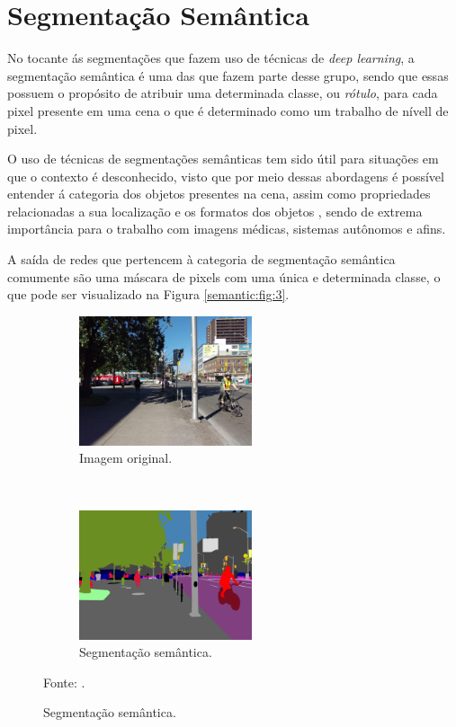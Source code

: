 \clearpage
\newpage
\section{Segmentação Semântica}
\label{semantic:semantic}

No tocante ás segmentações que fazem uso de técnicas de \textit{deep learning}, a segmentação semântica é uma das que fazem parte desse grupo, sendo que essas possuem o propósito de atribuir uma determinada classe, ou \textit{rótulo}, para cada pixel presente em uma cena \cite{Wang2017, Ghosh2019, Shelhamer2016, Arbelaez2012,Zhang2018} o que é determinado como um trabalho de nívell de pixel.

O uso de técnicas de segmentações semânticas tem sido útil para situações em que o contexto é desconhecido, visto que por meio dessas abordagens é possível entender á categoria dos objetos presentes na cena, assim como propriedades relacionadas a sua localização e os formatos dos objetos \cite{Zhang2018}, sendo de extrema importância para o trabalho com imagens médicas, sistemas autônomos e afins.

A saída de redes que pertencem à categoria de segmentação semântica comumente são uma máscara de 
pixels com uma única e determinada classe, o que pode ser visualizado na Figura \ref{semantic:fig:3}.

\begin{figure}[H]
   \caption{Segmentação semântica.}
   \centering
   \label{semantic:fig:3}
    \begin{subfigure}[t]{0.45\textwidth}
        \centering
        \includegraphics[height=1.5in]{recursos/imagens/semantic/t1.jpg}
        \caption{Imagem original.}
        \label{semantic:fig:3.1}
    \end{subfigure}%
    ~ 
    \begin{subfigure}[t]{0.45\textwidth}
        \centering
        \includegraphics[height=1.5in]{recursos/imagens/semantic/s1.png}
        \caption{Segmentação semântica.}
        \label{semantic:fig:3.2}
    \end{subfigure}%

    \vspace*{1 cm}
    Fonte: \cite{Neuhold2017_ICCV}.
\end{figure}

